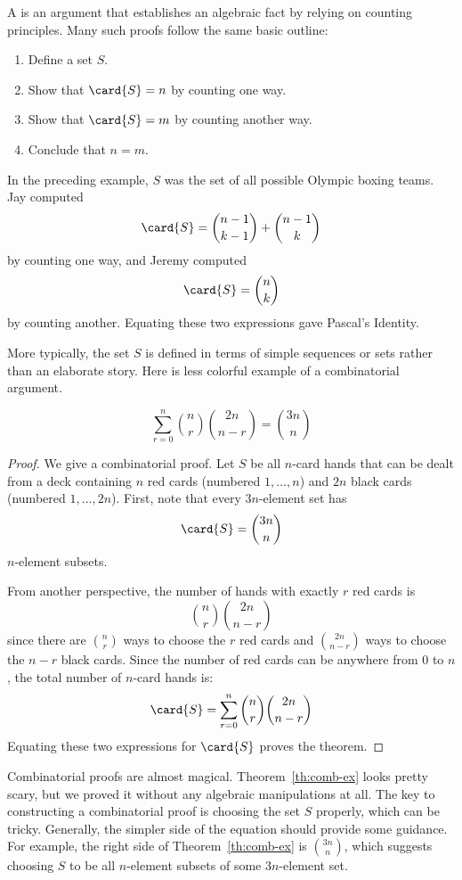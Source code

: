 A  is an argument that establishes an
algebraic fact by relying on counting principles.  Many such proofs
follow the same basic outline:
%
\begin{enumerate}

\item Define a set $S$.

\item Show that $\card{S} = n$ by counting one way.

\item Show that $\card{S} = m$ by counting another way.

\item Conclude that $n = m$.

\end{enumerate}
%
In the preceding example, $S$ was the set of all possible Olympic boxing
teams.  Jay computed
\[
\card{S} = \binom{n-1}{k-1} + \binom{n-1}{k}
\]
by counting one way, and Jeremy computed
\[
\card{S} = \binom{n}{k}
\]
by counting another.  Equating these two expressions gave Pascal's
Identity.

More typically, the set $S$ is defined in terms of simple sequences or
sets rather than an elaborate story.  Here is less colorful example of a
combinatorial argument.

\begin{theorem}
\label{th:comb-ex}
\[
\sum_{r=0}^n \binom{n}{r} \binom{2n}{n-r} = \binom{3n}{n}
\]
\end{theorem}

\begin{proof}
We give a combinatorial proof.  Let $S$ be all $n$-card hands that can
be dealt from a deck containing $n$ red cards (numbered $1, \dots,
n$) and $2n$ black cards (numbered $1, \dots, 2n$).  First, note that
every $3n$-element set has
%
\[
\card{S} = \binom{3n}{n}
\]
%
$n$-element subsets.

From another perspective, the number of hands with exactly $r$ red
cards is
%
\[
\binom{n}{r} \binom{2n}{n - r}
\]
%
since there are $\binom{n}{r}$ ways to choose the $r$ red cards and
$\binom{2n}{n - r}$ ways to choose the $n - r$ black cards.  Since the
number of red cards can be anywhere from 0 to $n$, the total number of
$n$-card hands is:
%
\[
\card{S} = \sum_{r=0}^n \binom{n}{r} \binom{2n}{n-r}
\]
%
Equating these two expressions for $\card{S}$ proves the theorem.
\end{proof}

Combinatorial proofs are almost magical.  Theorem~\ref{th:comb-ex}
looks pretty scary, but we proved it without any algebraic
manipulations at all.  The key to constructing a combinatorial proof
is choosing the set $S$ properly, which can be tricky.  Generally, the
simpler side of the equation should provide some guidance.  For
example, the right side of Theorem~\ref{th:comb-ex} is
$\binom{3n}{n}$, which suggests choosing $S$ to be all $n$-element
subsets of some $3n$-element set.

\begin{problems}
\classproblems
{}

\homeworkproblems
{}

\end{problems}
\endinput
